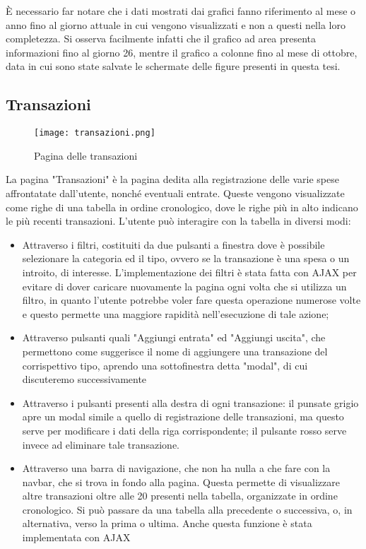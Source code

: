 \documentclass[binding=0.6cm, oneside, noexaminfo, italian]{sapthesis}
\begin{document}
\MakeUppercase{è} necessario far notare che i dati mostrati dai grafici fanno riferimento al mese o anno fino al giorno attuale in cui vengono visualizzati e non a questi nella loro completezza. Si osserva facilmente infatti che il grafico ad area presenta informazioni fino al giorno 26, mentre il grafico a colonne fino al mese di ottobre, data in cui sono state salvate le schermate delle figure presenti in questa tesi.
\newpage
\subsection{Transazioni}
\begin{figure}[h]
    \centering
    \texttt{[image: transazioni.png]}
    \caption{Pagina delle transazioni}
    \label{fig:transazioni}
\end{figure}
La pagina "Transazioni" è la pagina dedita alla registrazione delle varie spese affrontatate dall'utente, nonché eventuali entrate. Queste vengono visualizzate come righe di una tabella in ordine cronologico, dove le righe più in alto indicano le più recenti transazioni. L'utente può interagire con la tabella in diversi modi:
\begin{itemize}
    \item Attraverso i filtri, costituiti da due pulsanti a finestra dove è possibile selezionare la categoria ed il tipo, ovvero se la transazione è una spesa o un introito, di interesse. L'implementazione dei filtri è stata fatta con AJAX per evitare di dover caricare nuovamente la pagina ogni volta che si utilizza un filtro, in quanto l'utente potrebbe voler fare questa operazione numerose volte e questo permette una maggiore rapidità nell'esecuzione di tale azione;
    \item Attraverso pulsanti quali "Aggiungi entrata" ed "Aggiungi uscita", che permettono come suggerisce il nome di aggiungere una transazione del corrispettivo tipo, aprendo una sottofinestra detta "modal", di cui discuteremo successivamente
    \item Attraverso i pulsanti presenti alla destra di ogni transazione: il punsate grigio apre un modal simile a quello di registrazione delle transazioni, ma questo serve per modificare i dati della riga corrispondente; il pulsante rosso serve invece ad eliminare tale transazione.
    \item Attraverso una barra di navigazione, che non ha nulla a che fare con la navbar, che si trova in fondo alla pagina. Questa permette di visualizzare altre transazioni oltre alle 20 presenti nella tabella, organizzate in ordine cronologico. Si può passare da una tabella alla precedente o successiva, o, in alternativa, verso la prima o ultima. Anche questa funzione è stata implementata con AJAX
\end{itemize}
\end{document}
